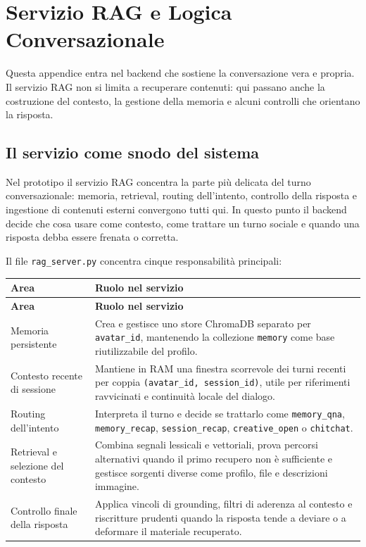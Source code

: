 \chapter{Servizio RAG e Logica Conversazionale}
\label{app:rag}

Questa appendice entra nel backend che sostiene la conversazione vera e propria. Il servizio RAG non si limita a recuperare contenuti: qui passano anche la costruzione del contesto, la gestione della memoria e alcuni controlli che orientano la risposta.

\section{Il servizio come snodo del sistema}
\noindent Nel prototipo il servizio RAG concentra la parte più delicata del turno conversazionale: memoria, retrieval, routing dell'intento, controllo della risposta e ingestione di contenuti esterni convergono tutti qui. In questo punto il backend decide che cosa usare come contesto, come trattare un turno sociale e quando una risposta debba essere frenata o corretta.

Il file \texttt{rag\_server.py} concentra cinque responsabilità principali:

\par\begingroup
\scriptsize
\setlength{\LTleft}{0pt}
\setlength{\LTright}{0pt}
\captionsetup{type=table}
\label{tab:appendix-rag-areas}
\begin{longtable}{|>{\raggedright\arraybackslash}p{}|>{\raggedright\arraybackslash}p{}|}
\hline
\textbf{Area} & \textbf{Ruolo nel servizio} \\
\hline
\endfirsthead
\hline
\textbf{Area} & \textbf{Ruolo nel servizio} \\
\hline
\endhead
Memoria persistente & Crea e gestisce uno store ChromaDB separato per \texttt{avatar\_id}, mantenendo la collezione \texttt{memory} come base riutilizzabile del profilo. \\
\hline
Contesto recente di sessione & Mantiene in RAM una finestra scorrevole dei turni recenti per coppia \texttt{(avatar\_id, session\_id)}, utile per riferimenti ravvicinati e continuità locale del dialogo. \\
\hline
Routing dell'intento & Interpreta il turno e decide se trattarlo come \texttt{memory\_qna}, \texttt{memory\_recap}, \texttt{session\_recap}, \texttt{creative\_open} o \texttt{chitchat}. \\
\hline
Retrieval e selezione del contesto & Combina segnali lessicali e vettoriali, prova percorsi alternativi quando il primo recupero non è sufficiente e gestisce sorgenti diverse come profilo, file e descrizioni immagine. \\
\hline
Controllo finale della risposta & Applica vincoli di grounding, filtri di aderenza al contesto e riscritture prudenti quando la risposta tende a deviare o a deformare il materiale recuperato. \\
\hline
\end{longtable}
\par\endgroup

